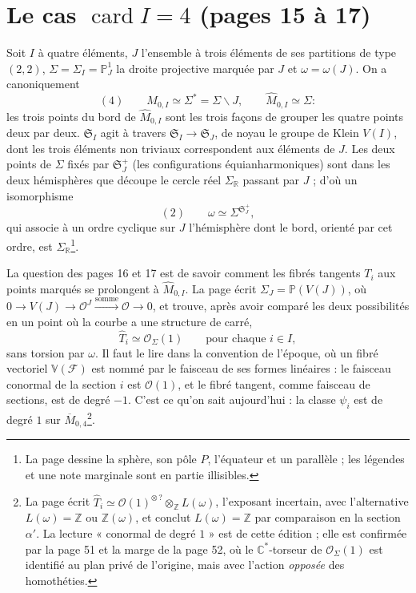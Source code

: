 \documentclass[11pt,a4paper]{article}
\begin{document}
\section*{Le cas $\operatorname{card} I = 4$ (pages 15 à 17)}

Soit $I$ à quatre éléments, $J$ l'ensemble à trois éléments de ses partitions
de type $(2,2)$, $\Sigma = \Sigma_I = \mathbb{P}^1_J$ la droite projective
marquée par $J$ et $\omega = \omega(J)$. On a canoniquement
\[
(4)\qquad M_{0,I} \simeq \Sigma^{*} = \Sigma \smallsetminus J, \qquad
\widehat{M}_{0,I} \simeq \Sigma :
\]
les trois points du bord de $\widehat{M}_{0,I}$ sont les trois façons de
grouper les quatre points deux par deux. $\mathfrak{S}_I$ agit à travers
$\mathfrak{S}_I \to \mathfrak{S}_J$, de noyau le groupe de Klein $V(I)$, dont
les trois éléments non triviaux correspondent aux éléments de $J$. Les deux
points de $\Sigma$ fixés par $\mathfrak{S}_J^{+}$ (les configurations
équianharmoniques) sont dans les deux hémisphères que découpe le cercle réel
$\Sigma_{\mathbb{R}}$ passant par $J$ ; d'où un isomorphisme
\[
(2)\qquad \omega \simeq \Sigma^{\mathfrak{S}_J^{+}},
\]
qui associe à un ordre cyclique sur $J$ l'hémisphère dont le bord, orienté par
cet ordre, est $\Sigma_{\mathbb{R}}$\footnote{La page dessine la sphère, son
pôle $P$, l'équateur et un parallèle ; les légendes et une note marginale sont
en partie illisibles.}.

La question des pages 16 et 17 est de savoir comment les fibrés tangents
$T_i$ aux points marqués se prolongent à $\widehat{M}_{0,I}$. La page écrit
$\Sigma_J = \mathbb{P}(V(J))$, où $0 \to V(J) \to \mathcal{O}^J
\xrightarrow{\text{somme}} \mathcal{O} \to 0$, et trouve, après avoir comparé
les deux possibilités en un point où la courbe a une structure de carré,
\[
\widehat{T}_i \simeq \mathcal{O}_\Sigma(1) \qquad \text{pour chaque } i \in I,
\]
sans torsion par $\omega$. Il faut le lire dans la convention de l'époque, où
un fibré vectoriel $\mathbb{V}(\mathcal{F})$ est nommé par le faisceau de ses
formes linéaires : le faisceau conormal de la section $i$ est
$\mathcal{O}(1)$, et le fibré tangent, comme faisceau de sections, est de
degré $-1$. C'est ce qu'on sait aujourd'hui : la classe $\psi_i$ est de degré
$1$ sur $\overline{M}_{0,4}$\footnote{La page écrit $\widehat{T}_i \simeq
\mathcal{O}(1)^{\otimes\,?} \otimes_{\mathbb{Z}} L(\omega)$, l'exposant incertain,
avec l'alternative $L(\omega) = \mathbb{Z}$ ou $\mathbb{Z}(\omega)$, et conclut
$L(\omega) = \mathbb{Z}$ par comparaison en la section $\alpha'$. La lecture
« conormal de degré $1$ » est de cette édition ; elle est confirmée par la
page 51 et la marge de la page 52, où le $\mathbb{C}^{*}$-torseur de
$\mathcal{O}_\Sigma(1)$ est identifié au plan privé de l'origine, mais avec
l'action \emph{opposée} des homothéties.}.
\end{document}
